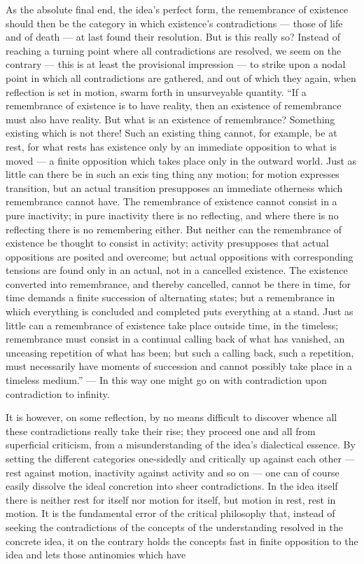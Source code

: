 \documentclass[12pt,a4paper]{book}
\begin{document}
As the absolute final end, the idea's perfect form, the remembrance of existence
should then be the category in which existence's contradictions --- those of life
and of death --- at last found their resolution. But is this really so? Instead of
reaching a turning point where all contradictions are resolved, we seem on the
contrary --- this is at least the provisional impression --- to strike upon a
nodal point in which all contradictions are gathered, and out of which they again,
when reflection is set in motion, swarm forth in unsurveyable quantity. ``If a
remembrance of existence is to have reality, then an existence of remembrance must
also have reality. But what is an existence of remembrance? Something existing
which is not there! Such an existing thing cannot, for example, be at rest, for
what rests has existence only by an immediate opposition to what is moved --- a
finite opposition which takes place only in the outward world. Just as little can
there be in such an exis%
ting thing any motion; for motion expresses transition, but an actual transition
presupposes an immediate otherness which remembrance cannot have. The remembrance
of existence cannot consist in a pure inactivity; in pure inactivity there is no
reflecting, and where there is no reflecting there is no remembering either. But
neither can the remembrance of existence be thought to consist in activity;
activity presupposes that actual oppositions are posited and overcome; but actual
oppositions with corresponding tensions are found only in an actual, not in a
cancelled existence. The existence converted into remembrance, and thereby
cancelled, cannot be there in time, for time demands a finite succession of
alternating states; but a remembrance in which everything is concluded and
completed puts everything at a stand. Just as little can a remembrance of
existence take place outside time, in the timeless; remembrance must consist in a
continual calling back of what has vanished, an unceasing repetition of what has
been; but such a calling back, such a repetition, must necessarily have moments of
succession and cannot possibly take place in a timeless medium.'' --- In this way
one might go on with contradiction upon contradiction to infinity.

It is however, on some reflection, by no means difficult to discover whence all
these contradictions really take their rise; they proceed one and all from
superficial criticism, from a misunderstanding of the idea's dialectical essence.
By setting the different categories one-sidedly and critically up against each
other --- rest against motion, inactivity against activity and so on --- one can
of course easily dissolve the ideal concretion into sheer contradictions. In the
idea itself there is neither rest for itself nor motion for itself, but motion in
rest, rest in motion. It is the fundamental error of the critical philosophy that,
instead of seeking the contradictions of the concepts of the understanding
resolved in the concrete idea, it on the contrary holds the concepts fast in
finite opposition to the idea and lets those antinomies which have
\end{document}
